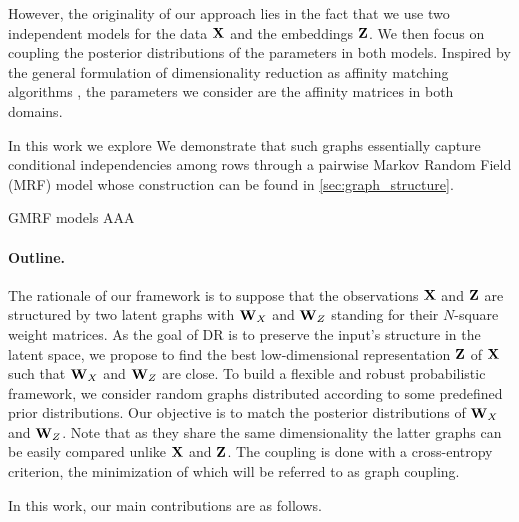 However, the originality of our approach lies in the fact that we use two independent models for the data ${\mathbf{X}}$ and the embeddings ${\mathbf{Z}}$. We then focus on coupling the posterior distributions of the parameters in both models. Inspired by the general formulation of dimensionality reduction as affinity matching algorithms , the parameters we consider are the affinity matrices in both domains.

In this work we explore We demonstrate that such graphs essentially capture conditional independencies among rows through a pairwise Markov Random Field (MRF) model whose construction can be found in \cref{sec:graph_structure}. 



\begin{mem1}{GMRF models}
    AAA
\end{mem1}


\paragraph{Outline.} 
The rationale of our framework is to suppose that the observations $\mathbf{X}$ and $\mathbf{Z}$ are structured by two latent graphs with $\mathbf{W}_{X}$ and $\mathbf{W}_{Z}$ standing for their $N$-square weight matrices.
As the goal of DR is to preserve the input's structure in the latent space, we propose to find the best low-dimensional representation $\mathbf{Z}$ of $\mathbf{X}$ such that $\mathbf{W}_{X}$ and $\mathbf{W}_{Z}$ are close. To build a flexible and robust probabilistic framework, we consider random graphs distributed according to some predefined prior distributions. Our objective is to match the posterior distributions of $\mathbf{W}_{X}$ and $\mathbf{W}_{Z}$. Note that as they share the same dimensionality the latter graphs can be easily compared unlike $\mathbf{X}$ and $\mathbf{Z}$. The coupling is done with a cross-entropy criterion, the minimization of which will be referred to as graph coupling.

In this work, our main contributions are as follows.

